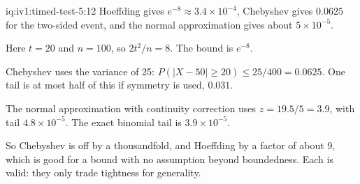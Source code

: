 \begin{solution}{iq:iv1:timed-test-5:12}
Hoeffding gives $e^{-8} \approx 3.4 \times 10^{-4}$, Chebyshev gives $0.0625$ for the two-sided event, and the normal approximation gives about $5 \times 10^{-5}$.

Here $t = 20$ and $n = 100$, so $2t^2/n = 8$. The bound is $e^{-8}$.

Chebyshev uses the variance of 25: $P(|X - 50| \ge 20) \le 25/400 = 0.0625$. One tail is at most half of this if symmetry is used, $0.031$.

The normal approximation with continuity correction uses $z = 19.5/5 = 3.9$, with tail $4.8 \times 10^{-5}$. The exact binomial tail is $3.9 \times 10^{-5}$.

So Chebyshev is off by a thousandfold, and Hoeffding by a factor of about 9, which is good for a bound with no assumption beyond boundedness. Each is valid: they only trade tightness for generality.

\end{solution}
